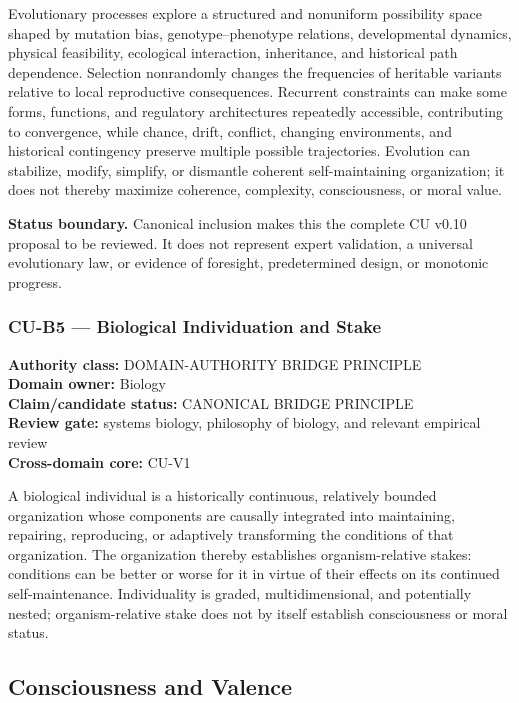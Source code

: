 \documentclass[
  11pt,
]{article}
\begin{document}
Evolutionary processes explore a structured and nonuniform possibility
space shaped by mutation bias, genotype--phenotype relations,
developmental dynamics, physical feasibility, ecological interaction,
inheritance, and historical path dependence. Selection nonrandomly
changes the frequencies of heritable variants relative to local
reproductive consequences. Recurrent constraints can make some forms,
functions, and regulatory architectures repeatedly accessible,
contributing to convergence, while chance, drift, conflict, changing
environments, and historical contingency preserve multiple possible
trajectories. Evolution can stabilize, modify, simplify, or dismantle
coherent self-maintaining organization; it does not thereby maximize
coherence, complexity, consciousness, or moral value.

\textbf{Status boundary.} Canonical inclusion makes this the complete CU
v0.10 proposal to be reviewed. It does not represent expert validation,
a universal evolutionary law, or evidence of foresight, predetermined
design, or monotonic progress.

\subsubsection{CU-B5 --- Biological Individuation and
Stake}\label{cu-b5-biological-individuation-and-stake}

\textbf{Authority class:} DOMAIN-AUTHORITY BRIDGE PRINCIPLE\\
\textbf{Domain owner:} Biology\\
\textbf{Claim/candidate status:} CANONICAL BRIDGE PRINCIPLE\\
\textbf{Review gate:} systems biology, philosophy of biology, and
relevant empirical review\\
\textbf{Cross-domain core:} CU-V1

A biological individual is a historically continuous, relatively bounded
organization whose components are causally integrated into maintaining,
repairing, reproducing, or adaptively transforming the conditions of
that organization. The organization thereby establishes
organism-relative stakes: conditions can be better or worse for it in
virtue of their effects on its continued self-maintenance. Individuality
is graded, multidimensional, and potentially nested; organism-relative
stake does not by itself establish consciousness or moral status.

\subsection{Consciousness and Valence}\label{consciousness-and-valence}
\end{document}
